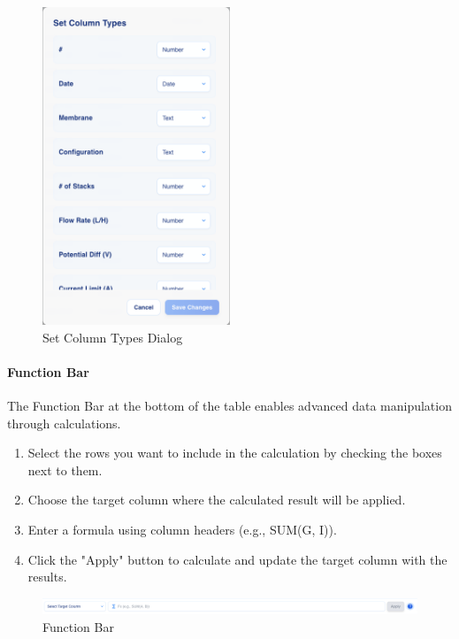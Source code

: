 \documentclass[12pt]{article}
\begin{document}
\begin{figure}[H]
    \centering
    \includegraphics[width=0.5\textwidth]{./Diagrams/SetColumnType.png}
    \caption{Set Column Types Dialog}
\end{figure}

\paragraph{Function Bar}
The Function Bar at the bottom of the table enables advanced data manipulation
through calculations.
\begin{enumerate}
    \item Select the rows you want to include in the calculation by checking the
    boxes next to them.
    \item Choose the target column where the calculated result will be applied.
    \item Enter a formula using column headers (e.g., SUM(G, I)).
    \item Click the "Apply" button to calculate and update the target column
    with the results.
\end{enumerate}


\begin{figure}[H]
    \centering
    \includegraphics[width=1\textwidth]{./Diagrams/FunctionBar.png}
    \caption{Function Bar}
\end{figure}
\end{document}
